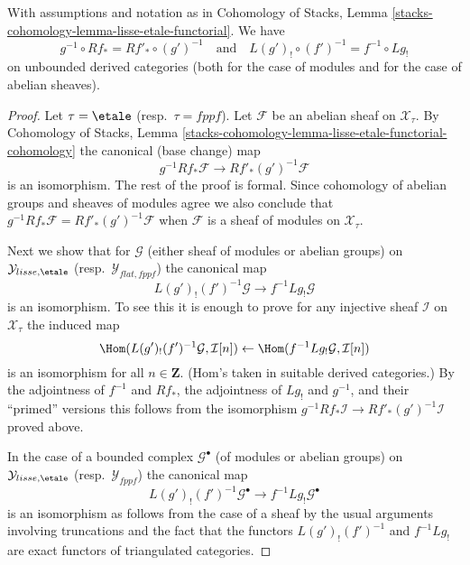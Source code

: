 \begin{lemma}
\label{lemma-lisse-etale-functorial-derived}
With assumptions and notation as in
Cohomology of Stacks,
Lemma \ref{stacks-cohomology-lemma-lisse-etale-functorial}.
We have
$$
g^{-1} \circ Rf_* = Rf'_* \circ (g')^{-1}
\quad\text{and}\quad
L(g')_! \circ (f')^{-1} = f^{-1} \circ Lg_!
$$
on unbounded derived categories
(both for the case of modules and for the case of abelian sheaves).
\end{lemma}

\begin{proof}
Let $\tau = \etale$ (resp.\ $\tau = fppf$). Let $\mathcal{F}$ be an abelian
sheaf on $\mathcal{X}_\tau$. By Cohomology of Stacks, Lemma
\ref{stacks-cohomology-lemma-lisse-etale-functorial-cohomology}
the canonical (base change) map
$$
g^{-1}Rf_*\mathcal{F} \longrightarrow Rf'_*(g')^{-1}\mathcal{F}
$$
is an isomorphism. The rest of the proof is formal. Since cohomology of
abelian groups and sheaves of modules agree we also conclude that 
$g^{-1} Rf_*\mathcal{F} = Rf'_* (g')^{-1}\mathcal{F}$ when $\mathcal{F}$
is a sheaf of modules on $\mathcal{X}_\tau$.

\medskip\noindent
Next we show that for $\mathcal{G}$ (either sheaf of modules
or abelian groups) on
$\mathcal{Y}_{lisse,\etale}$ (resp.\ $\mathcal{Y}_{flat,fppf}$)
the canonical map
$$
L(g')_!(f')^{-1}\mathcal{G} \to f^{-1}Lg_!\mathcal{G}
$$
is an isomorphism. To see this it is enough to prove for any
injective sheaf $\mathcal{I}$ on $\mathcal{X}_\tau$ the induced map
$$
\Hom(L(g')_!(f')^{-1}\mathcal{G}, \mathcal{I}[n])
\leftarrow
\Hom(f^{-1}Lg_!\mathcal{G}, \mathcal{I}[n])
$$
is an isomorphism for all $n \in \mathbf{Z}$. (Hom's taken
in suitable derived categories.) By the adjointness of
$f^{-1}$ and $Rf_*$, the adjointness of $Lg_!$ and $g^{-1}$, and
their ``primed'' versions this follows from the isomorphism
$g^{-1} Rf_*\mathcal{I} \to Rf'_* (g')^{-1}\mathcal{I}$ proved above.

\medskip\noindent
In the case of a bounded complex $\mathcal{G}^\bullet$
(of modules or abelian groups) on
$\mathcal{Y}_{lisse,\etale}$ (resp.\ $\mathcal{Y}_{fppf}$)
the canonical map
\begin{equation}
\label{equation-to-show}
L(g')_!(f')^{-1}\mathcal{G}^\bullet \to f^{-1}Lg_!\mathcal{G}^\bullet
\end{equation}
is an isomorphism as follows from the case of a sheaf by the usual arguments
involving truncations and the fact that the functors
$L(g')_!(f')^{-1}$ and $f^{-1}Lg_!$ are exact functors of
triangulated categories.


\end{proof}
